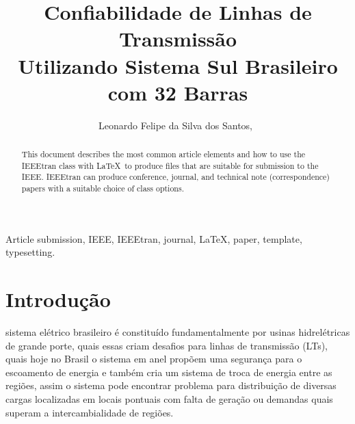 \documentclass[lettersize,journal]{IEEEtran}
\begin{document}
\title{Confiabilidade de Linhas de Transmissão\\ Utilizando Sistema Sul Brasileiro \\ com 32 Barras}

\author{Leonardo Felipe da Silva dos Santos,~\\ }



\maketitle

{
\begin{abstract}
This document describes the most common article elements and how to use the IEEEtran class with \LaTeX \ to produce files that are suitable for submission to the IEEE.  IEEEtran can produce conference, journal, and technical note (correspondence) papers with a suitable choice of class options. 
\end{abstract}
}

\begin{IEEEkeywords}
Article submission, IEEE, IEEEtran, journal, \LaTeX, paper, template, typesetting.
\end{IEEEkeywords}

\section{Introdução}
 sistema elétrico brasileiro é constituído fundamentalmente por usinas hidrelétricas de grande porte, quais essas criam desafios para linhas de transmissão (LTs), quais hoje no Brasil o sistema em anel propõem uma segurança para o escoamento de energia e também cria um sistema de troca de energia entre as regiões, assim o sistema pode encontrar problema para distribuição de diversas cargas localizadas em locais pontuais com falta de geração ou demandas quais superam a intercambialidade de regiões.
\end{document}
